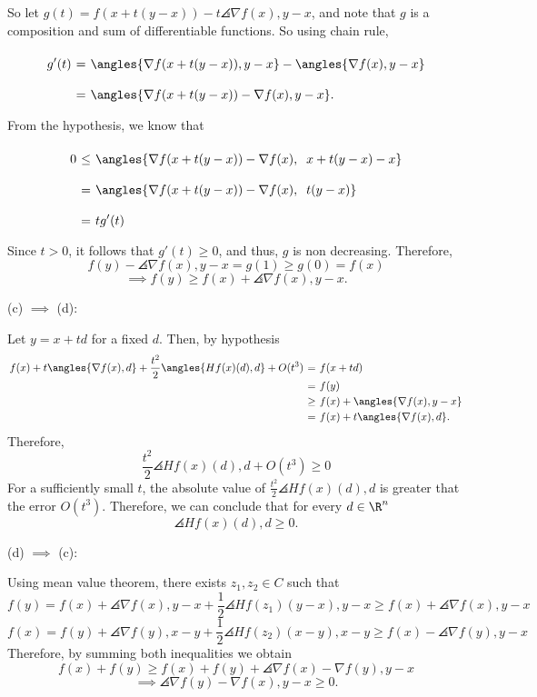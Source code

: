 So let $g(t) = f (x+t(y-x))-t\angles{\nabla f(x), y-x}$, and note that $g$ is a composition and sum of differentiable functions. So using chain rule,
\[ \everymath{\displaystyle}
\arraycolsep=1.8pt\def\arraystretch{2}
\begin{array}{rcl}
    g'(t) & = & \angles{\nabla f(x + t(y-x)), y-x} - \angles{\nabla f(x), y-x}\\
    & = & \angles{\nabla f(x + t(y-x)) - \nabla f(x), y-x}.
\end{array} \]
From the hypothesis, we know that
\[ \everymath{\displaystyle}
\arraycolsep=1.8pt\def\arraystretch{2}
\begin{array}{rcl}
    0 & \leq & \angles{\nabla f(x + t(y-x)) - \nabla f(x),\;\; x+t(y-x) - x}\\
    & = &  \angles{\nabla f(x + t(y-x)) - \nabla f(x),\;\; t(y-x)}\\
    & = & t g'(t)
\end{array}  \]
Since $t > 0$, it follows that $g'(t) \geq 0$, and thus, $g$ is non decreasing. Therefore, 
\[ f(y) - \angles{\nabla f(x), y-x} = g(1) \geq g(0) = f(x)  \]
\[ \implies f(y) \geq f(x) + \angles{\nabla f(x), y-x}. \]


\hspace*{-3em} (c) $\implies$ (d):

Let $y = x + td$ for a fixed $d$. Then, by hypothesis
\[ \everymath{\displaystyle}
\arraycolsep=1.8pt\def\arraystretch{1.2}
\begin{array}{rcl}
    f(x) + t\angles{ \nabla f(x), d} + \frac{t^2}{2}\angles{H f(x)(d), d} + O(t^3) & = & f(x + td)\\
    & = & f(y)\\
    & \geq & f(x) + \angles{\nabla f(x), y-x}\\
    & = & f(x) + t\angles{\nabla f(x), d}.
\end{array} \]
Therefore,
\[ \frac{t^2}{2}\angles{H f(x)(d), d} + O(t^3) \geq 0 \]
For a sufficiently small $t$, the absolute value of $\frac{t^2}{2}\angles{H f(x)(d), d}$ is greater that the error $O(t^3)$. Therefore, we can conclude that for every $d \in \R^n$
\[ \angles{H f(x)(d), d} \geq 0. \]

\hspace*{-3em} (d) $\implies$ (c):

Using mean value theorem, there exists $z_1, z_2 \in C$ such that
\[ f(y) = f(x) + \angles{\nabla f(x), y-x} + \frac{1}{2} \angles{Hf(z_1)(y-x), y-x} \geq f(x) + \angles{\nabla f(x), y-x} \]
\[ f(x) = f(y) + \angles{\nabla f(y), x-y} + \frac{1}{2} \angles{Hf(z_2)(x-y), x-y} \geq f(x) - \angles{\nabla f(y), y-x} \]
Therefore, by summing both inequalities we obtain
\[ f(x) + f(y) \geq f(x) + f(y) + \angles{\nabla f(x) - \nabla f(y), y-x}\]
\[ \implies \angles{\nabla f(y) - \nabla f(x), y-x} \geq 0. \]
